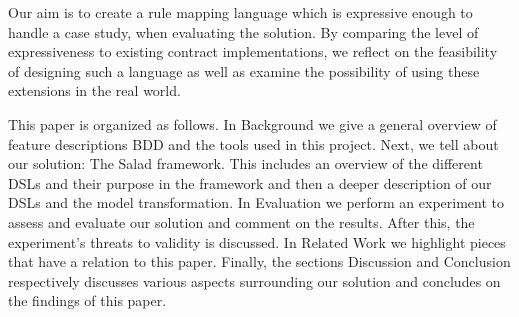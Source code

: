 Our aim is to create a rule mapping language which is expressive enough to handle a case study, when evaluating the solution.
By comparing the level of expressiveness to existing contract implementations, 
we reflect on the feasibility of designing such a language as well as examine the possibility of using these extensions in the real world.

This paper is organized as follows.
In Background we give a general overview of feature descriptions BDD and the tools used in this project. 
Next, we tell about our solution: The Salad framework.
This includes an overview of the different DSLs and their purpose in the framework and then a deeper description of our DSLs and the model transformation.
In Evaluation we perform an experiment to assess and evaluate our solution and comment on the results.
After this, the experiment's threats to validity is discussed.
In Related Work we highlight pieces that have a relation to this paper.
Finally, the sections Discussion and Conclusion respectively discusses various aspects surrounding our solution and concludes on the findings of this paper.


